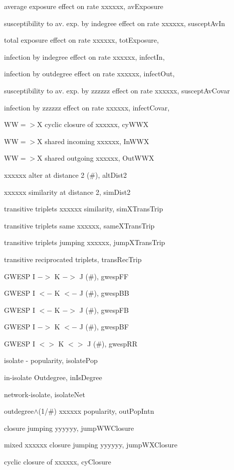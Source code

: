 \documentclass[a4paper,fleqn,11pt]{article}
\newcommand{\+}{\, + \,}
\newcommand{\sfn}[1]{\textsf{#1}}
\begin{document}
\begin{small}
\begin{itemize}
\begin{itemize}
		average exposure effect on rate xxxxxx, \sfn{avExposure}

		susceptibility to av. exp. by indegree effect on rate xxxxxx,
			\sfn{susceptAvIn}

		total exposure effect on rate xxxxxx, \sfn{totExposure},

		infection by indegree effect on rate xxxxxx, \sfn{infectIn},

		infection by outdegree effect on rate xxxxxx, \sfn{infectOut},

		susceptibility to av. exp. by zzzzzz effect on rate xxxxxx,
			\sfn{susceptAvCovar}

		infection by zzzzzz effect on rate xxxxxx, \sfn{infectCovar,}

		WW$=>$X cyclic closure of xxxxxx, \sfn{cyWWX}

		WW$=>$X shared incoming xxxxxx, \sfn{InWWX}

		WW$=>$X shared outgoing xxxxxx, \sfn{OutWWX}

		xxxxxx alter at distance 2 (\#), \sfn{altDist2}

		xxxxxx similarity at distance 2, \sfn{simDist2}

		transitive triplets xxxxxx similarity, \sfn{simXTransTrip}

		transitive triplets same xxxxxx, \sfn{sameXTransTrip}

		transitive triplets jumping xxxxxx, \sfn{jumpXTransTrip}

		transitive reciprocated triplets, \sfn{transRecTrip}

		GWESP I $->$ K $->$ J (\#), \sfn{gwespFF}

		GWESP I $<-$ K $<-$ J (\#), \sfn{gwespBB}

		GWESP I $<-$ K $->$ J (\#), \sfn{gwespFB}

		GWESP I $->$ K $<-$ J (\#), \sfn{gwespBF}

		GWESP I $<>$ K $<>$ J (\#), \sfn{gwespRR}

		isolate - popularity, \sfn{isolatePop}

		in-isolate Outdegree, \sfn{inIsDegree}

		network-isolate, \sfn{isolateNet}

		outdegree$\wedge$(1/\#) xxxxxx popularity, \sfn{outPopIntn}

		closure jumping yyyyyy, \sfn{jumpWWClosure}

		mixed xxxxxx closure jumping yyyyyy, \sfn{jumpWXClosure}

		cyclic closure of xxxxxx, \sfn{cyClosure}


\end{itemize}
\end{itemize}
\end{small}
\end{document}
